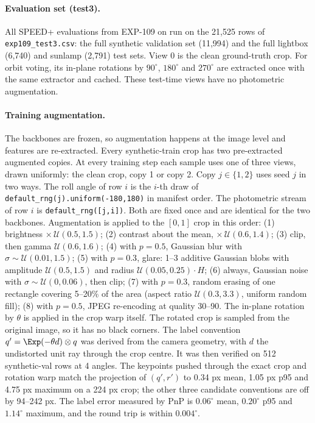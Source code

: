 \paragraph{Evaluation set (test3).}
All SPEED+ evaluations from EXP-109 on run on the 21{,}525 rows of \texttt{exp109\_test3.csv}: the full synthetic validation set (11{,}994) and the full lightbox (6{,}740) and sunlamp (2{,}791) test sets. View 0 is the clean ground-truth crop. For orbit voting, its in-plane rotations by $90^\circ$, $180^\circ$ and $270^\circ$ are extracted once with the same extractor and cached. These test-time views have no photometric augmentation.

\paragraph{Training augmentation.}\label{app:spp_aug}
The backbones are frozen, so augmentation happens at the image level and features are re-extracted. Every synthetic-train crop has two pre-extracted augmented copies. At every training step each sample uses one of three views, drawn uniformly: the clean crop, copy 1 or copy 2.
Copy $j\in\{1,2\}$ uses seed $j$ in two ways. The roll angle of row $i$ is the $i$-th draw of \texttt{default\_rng(j).uniform(-180,180)} in manifest order. The photometric stream of row $i$ is \texttt{default\_rng([j,i])}. Both are fixed once and are identical for the two backbones.
Augmentation is applied to the $[0,1]$ crop in this order:
(1) brightness $\times\,\mathcal{U}(0.5,1.5)$;
(2) contrast about the mean, $\times\,\mathcal{U}(0.6,1.4)$;
(3) clip, then gamma $\mathcal{U}(0.6,1.6)$;
(4) with $p=0.5$, Gaussian blur with $\sigma\sim\mathcal{U}(0.01,1.5)$;
(5) with $p=0.3$, glare: 1--3 additive Gaussian blobs with amplitude $\mathcal{U}(0.5,1.5)$ and radius $\mathcal{U}(0.05,0.25)\cdot H$;
(6) always, Gaussian noise with $\sigma\sim\mathcal{U}(0,0.06)$, then clip;
(7) with $p=0.3$, random erasing of one rectangle covering 5--20\% of the area (aspect ratio $\mathcal{U}(0.3,3.3)$, uniform random fill);
(8) with $p=0.5$, JPEG re-encoding at quality 30--90.
The in-plane rotation by $\theta$ is applied in the crop warp itself. The rotated crop is sampled from the original image, so it has no black corners.
The label convention $q'=\Exp(-\theta d)\otimes q$ was derived from the camera geometry, with $d$ the undistorted unit ray through the crop centre. It was then verified on 512 synthetic-val rows at 4 angles. The keypoints pushed through the exact crop and rotation warp match the projection of $(q',r')$ to 0.34 px mean, 1.05 px p95 and 4.75 px maximum on a 224 px crop; the other three candidate conventions are off by 94--242 px. The label error measured by PnP is $0.06^\circ$ mean, $0.20^\circ$ p95 and $1.14^\circ$ maximum, and the round trip is within $0.004^\circ$.

